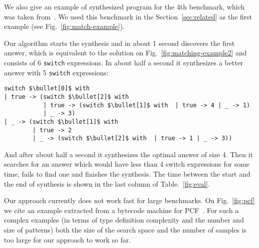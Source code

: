We also give an example of synthesized program for the 4th benchmark, which was taken from~\cite{maranget2008}. We used this benchmark in the Section~\ref{sec:related}
as the first example (see Fig.~\ref{fig:match-example}).

Our algorithm starts the
synthesis and in about 1 second discovers the first answer, which is equivalent to the solution on Fig.~\ref{fig:matching-example2} and
consists of 6 \lstinline|switch| expressions. In about half a second it synthesizes a better answer with 5 \lstinline|switch| expressions:

\begin{lstlisting}
switch $\bullet[0]$ with
| true -> (switch $\bullet[2]$ with  
           | true -> (switch $\bullet[1]$ with  | true -> 4 | _ -> 1)
           | _ -> 3)
| _ -> (switch $\bullet[1]$ with  
        | true -> 2
        | _ -> (switch $\bullet[2]$ with  | true -> 1 | _ -> 3))
\end{lstlisting}

And after about half a second it synthesizes the optimal answer of size 4. Then it searches for an answer which would have less than 4 switch expressions
for some time, fails to find one and finishes the synthesis. The time between the start and the end of synthesis is shown in the last column of Table.~\ref{fig:eval}.

Our approach currently does not work fast for large benchmarks. On Fig.~\ref{fig:pcf} we cite an example extracted from a bytecode
machine for PCF~\cite{maranget2008,Plotkin1977LCFCA}. For such a complex examples (in terms of type definition complexity and the number and size of patterns)
both the size of the search space and the number of samples is too large for our approach to work so far.



